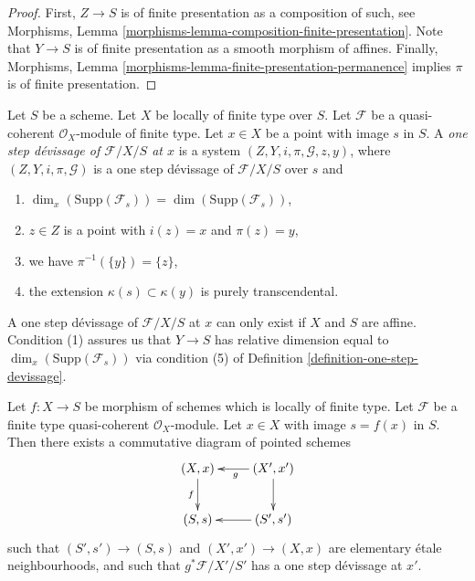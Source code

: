 \begin{proof}
First, $Z \to S$ is of finite presentation as a composition of such, see
Morphisms, Lemma \ref{morphisms-lemma-composition-finite-presentation}.
Note that $Y \to S$ is of finite presentation as a smooth morphism
of affines. Finally,
Morphisms, Lemma \ref{morphisms-lemma-finite-presentation-permanence}
implies $\pi$ is of finite presentation.
\end{proof}

\begin{definition}
\label{definition-one-step-devissage-at-x}
Let $S$ be a scheme.
Let $X$ be locally of finite type over $S$.
Let $\mathcal{F}$ be a quasi-coherent $\mathcal{O}_X$-module of finite type.
Let $x \in X$ be a point with image $s$ in $S$.
A {\it one step d\'evissage of $\mathcal{F}/X/S$ at $x$}
is a system $(Z, Y, i, \pi, \mathcal{G}, z, y)$, where
$(Z, Y, i, \pi, \mathcal{G})$ is a one step d\'evissage of
$\mathcal{F}/X/S$ over $s$ and
\begin{enumerate}
\item $\dim_x(\text{Supp}(\mathcal{F}_s)) = \dim(\text{Supp}(\mathcal{F}_s))$,
\item $z \in Z$ is a point with $i(z) = x$ and $\pi(z) = y$,
\item we have $\pi^{-1}(\{y\}) = \{z\}$,
\item the extension $\kappa(s) \subset \kappa(y)$ is purely
transcendental.
\end{enumerate}
\end{definition}

\noindent
A one step d\'evissage of $\mathcal{F}/X/S$ at $x$ can only exist if
$X$ and $S$ are affine. Condition (1) assures us that $Y \to S$ has
relative dimension equal to $\dim_x(\text{Supp}(\mathcal{F}_s))$
via condition (5) of
Definition \ref{definition-one-step-devissage}.

\begin{lemma}
\label{lemma-elementary-devissage-variant}
Let $f : X \to S$ be morphism of schemes which is locally of finite type.
Let $\mathcal{F}$ be a finite type quasi-coherent $\mathcal{O}_X$-module.
Let $x \in X$ with image $s = f(x)$ in $S$.
Then there exists a commutative diagram of pointed schemes
$$
\xymatrix{
(X, x) \ar[d]_f & (X', x') \ar[l]^g \ar[d] \\
(S, s) & (S', s') \ar[l] \\
}
$$
such that $(S', s') \to (S, s)$ and $(X', x') \to (X, x)$
are elementary \'etale neighbourhoods, and such that
$g^*\mathcal{F}/X'/S'$ has a one step d\'evissage at $x'$.
\end{lemma}

